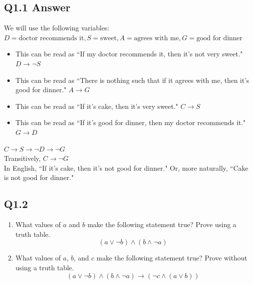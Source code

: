 \documentclass{article}
\begin{document}
\subsection*{Q1.1 Answer}
We will use the following variables: $D=\text{doctor recommends it},S=\text{sweet},A=\text{agrees with me},G=\text{good for dinner}$
\begin{itemize}
    \item This can be read as ``If my doctor recommends it, then it's not very sweet." $D\rightarrow \neg S$
    \item This can be read as ``There is nothing such that if it agrees with me, then it's good for dinner." $A\rightarrow G$
    \item This can be read as ``If it's cake, then it's very sweet." $C\rightarrow S$
    \item This can be read as ``If it's good for dinner, then my doctor recommends it." $G\rightarrow D$
\end{itemize}
$C\rightarrow S\rightarrow \neg D\rightarrow\neg G$
\\ Transitively, $C\rightarrow\neg G$
\\ In English, ``If it's cake, then it's not good for dinner." Or, more naturally, ``Cake is not good for dinner."
\newpage
{}
\subsection*{Q1.2}
\begin{enumerate}[label=\alph*.]
    \item What values of $a$ and $b$ make the following statement true? Prove using a truth table.
    $$(a \lor \neg b) \land (b \land \neg a)$$
    \item What values of $a$, $b$, and $c$ make the following statement true? Prove without using a truth table.
    $$(a \lor \neg b) \land (b \land \neg a)\rightarrow (\neg c\land(a \lor b))$$
\end{enumerate}
\newpage
\end{document}
